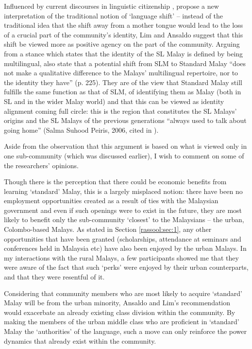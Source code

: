 Influenced by current discourses in linguistic citizenship \citep{FreelandEtAl2004,May2004,StroudEtAl2004}, \citet{LimEtAl2007} propose a new interpretation of the traditional notion of `language shift' -- instead of the traditional idea that the shift away from a mother tongue would lead to the loss of a crucial part of the community's identity, Lim and Ansaldo suggest that this shift be viewed more as positive agency on the part of the community. Arguing from a stance which states that the identity of the SL Malay is defined by being multilingual, \citet{LimEtAl2007} also state that a potential shift from SLM to Standard Malay ``does not make a qualitative difference to the Malays' multilingual repertoire, nor to the identity they have'' (p. 225). They are of the view that Standard Malay still fulfills the same function as that of SLM, of identifying them as Malay (both in SL and in the wider Malay world) and that this can be viewed as identity alignment coming full circle: this is the region that constitutes the SL Malays' origins and the SL Malays of the previous generations ``always used to talk about going home'' (Salma Suhood Peiris, 2006, cited in \citet[225]{LimEtAl2007}). 

Aside from the observation that this argument is based on what is viewed only in one sub-community (which was discussed earlier), I wish to comment on some of the researchers' opinions. 

Though there is the perception that there could be economic benefits from learning `standard' Malay, this is a largely misplaced notion: there have been no employment opportunities created as a result of ties with the Malaysian government and even if such openings were to exist in the future, they are most likely to benefit only the sub-community `closest' to the Malaysians -- the urban, Colombo-based Malays. As stated in Section \ref{rassool:sec:1}, any other opportunities that have been granted (scholarships, attendance at seminars and conferences held in Malaysia etc) have also been enjoyed by the urban Malays. In my interactions with the rural Malays, a few participants showed me that they were aware of the fact that  such `perks' were enjoyed by their urban counterparts, and that they were resentful of it. 

Considering that community members who are most likely to acquire `standard' Malay will be from the urban minority, Ansaldo and Lim's recommendation would exacerbate an already existing class division within the community. By making the members of the urban middle class who are proficient in `standard' Malay the `authorities' of the language, such a move can only reinforce the power dynamics that already exist within the community.


